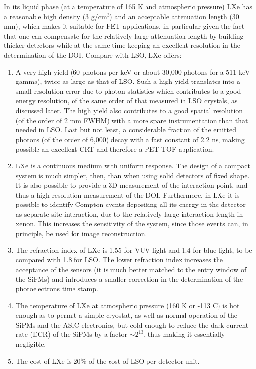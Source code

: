 In its liquid phase (at a temperature of 165 K and atmospheric pressure) LXe has a reasonable high density (3 g/cm$^3$) and an acceptable attenuation length (30 mm), which makes it suitable for PET applications, in particular given the fact that one can compensate for the relatively large attenuation length by building thicker detectors while at the same time keeping an excellent resolution in the determination of the DOI. Compare with LSO, LXe offers:
\begin{enumerate}
\item A very high yield (60 photons per keV or about 30,000 photons for a 511 keV gamma), twice as large as that of LSO. Such a high yield translates into a small resolution error due to photon statistics which contributes to a good energy resolution, of the same order of that measured in LSO crystals, as discussed later. The high yield also contributes to a good spatial resolution (of the order of 2 mm FWHM) with a more spare instrumentation than that needed in LSO. Last but not least, a considerable fraction of the emitted photons (of the order of 6,000) decay with a fast constant of 2.2 ns, making possible an excellent CRT and therefore a PET-TOF application. 
\item LXe is a continuous medium with uniform response. The design of a compact system is much simpler, then, than when using solid detectors of fixed shape. It is also possible to provide a 3D measurement of the interaction point, and thus a high resolution measurement of the DOI. Furthermore, in LXe it is possible to identify Compton events depositing all its energy in the detector as separate-site interaction, due to the relatively large interaction length in xenon. This increases the sensitivity of the system, since those events can, in principle, be used for image reconstruction. 
\item The refraction index of LXe is 1.55 for VUV light and 1.4 for blue light, to be compared with 1.8 for LSO. The lower refraction index increases the acceptance of the sensors (it is much better matched to the entry window of the SiPMs) and introduces a smaller correction in the determination of the photoelectrons time stamp. 
\item The temperature of LXe at atmospheric pressure (160 K or -113 C) is hot enough as to permit a simple cryostat, as well as normal operation of the SiPMs and the ASIC electronics, but cold enough to reduce the dark current rate (DCR) of the SiPMs by a factor $\sim 2^{13}$, thus making it essentially negligible. 
\item The cost of LXe is 20\% of the cost of LSO per detector unit. 
 \end{enumerate}


